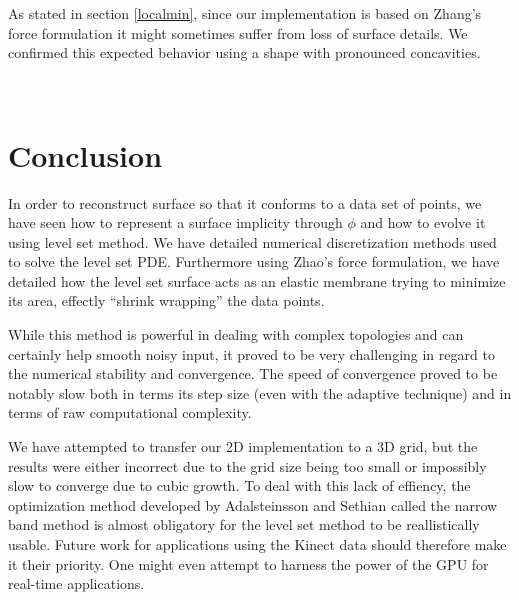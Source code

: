 \documentclass{article}
\begin{document}
As stated in section \ref{localmin}, since our implementation is based on
Zhang's force formulation it might sometimes suffer from loss of surface
details. We confirmed this expected behavior using a shape with pronounced
concavities.

\begin{figure}[H]
  \centering
  ~
\end{figure}


\section{Conclusion}

In order to reconstruct surface so that it conforms to a data set of points, we
have seen how to represent a surface implicity through $\phi$ and how to evolve
it using level set method. We have detailed numerical discretization methods
used to solve the level set PDE. Furthermore using Zhao's force formulation, we
have detailed how the level set surface acts as an elastic membrane trying to
minimize its area, effectly ``shrink wrapping'' the data points.


While this method is powerful in dealing with complex topologies and can
certainly help smooth noisy input, it proved to be very challenging in regard to
the numerical stability and convergence. The speed of convergence proved to be
notably slow both in terms its step size (even with the adaptive technique)
and in terms of raw computational complexity.

We have attempted to transfer our 2D implementation to a 3D grid, but the
results were either incorrect due to the grid size being too small or impossibly
slow to converge due to cubic growth. To deal with this lack of effiency, the
optimization method developed by Adalsteinsson and Sethian
\cite{adalsteinsson1994fast} called the narrow band method is almost
obligatory for the level set method to be reallistically usable. Future work for
applications using the Kinect data should therefore make it their priority. One
might even attempt to harness the power of the GPU for real-time
applications.



\end{document}
